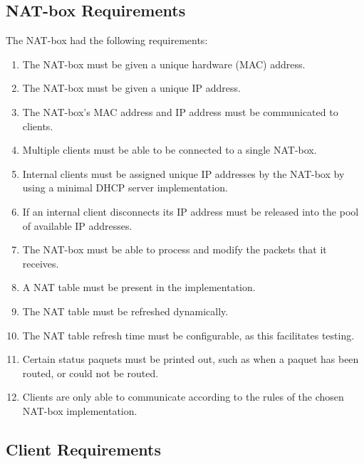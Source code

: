 \documentclass[10pt, a4paper]{article}
\begin{document}
\subsection{NAT-box Requirements}
\label{ssec:natreq}

The NAT-box had the following requirements:
\begin{enumerate}
  \item The NAT-box must be given a unique hardware (MAC) address.
  \item The NAT-box must be given a unique IP address.
  \item The NAT-box’s MAC address and IP address must be communicated to
    clients.
  \item Multiple clients must be able to be connected to a single NAT-box.
  \item Internal clients must be assigned unique IP addresses by the NAT-box by
    using a minimal DHCP server implementation.
  \item If an internal client disconnects its IP address must be released into
    the pool of available IP addresses.
  \item The NAT-box must be able to process and modify the packets that it
    receives.
  \item A NAT table must be present in the implementation.
  \item The NAT table must be refreshed dynamically.
  \item The NAT table refresh time must be configurable, as this facilitates
    testing.
  \item Certain status paquets must be printed out, such as when a paquet has
    been routed, or could not be routed.
  \item Clients are only able to communicate according to the rules of the
    chosen NAT-box implementation.
\end{enumerate}


\subsection{Client Requirements}
\label{ssec:clireq}
\end{document}
